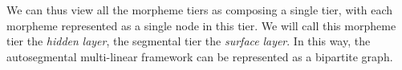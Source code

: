 We can thus view all the morpheme tiers as composing a single tier, with each morpheme represented as a single node in this tier.
We will call this morpheme tier the \emph{hidden} \emph{layer}, the segmental tier the \emph{surface} \emph{layer}. 
In this way, the autosegmental multi-linear framework can be represented as a bipartite graph.



